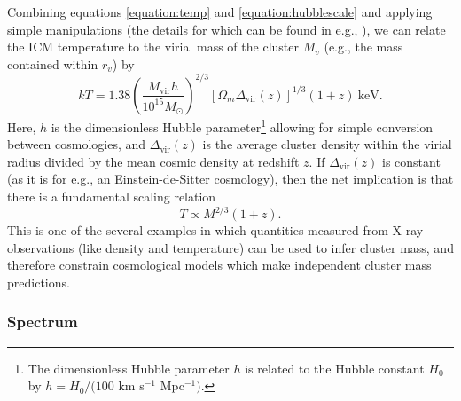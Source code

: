 Combining equations \ref{equation:temp} and \ref{equation:hubblescale} and applying simple manipulations 
(the details for which can be found in e.g., \citealt{rosati02}), we can relate the ICM temperature 
to the virial mass of the cluster $M_v$
(e.g., the mass contained within $r_v$) by 
\begin{equation}
kT = 1.38 \left( \frac{M_\mathrm{vir} h}{10^{15} M_\odot}    \right)^{2/3} \left[\Omega_m \Delta_\mathrm{vir}\left(z\right)\right]^{1/3}  \left( 1 + z \right) ~ \mathrm{keV}. 
\label{equation:tvir}
\end{equation}
Here, $ h$ is the dimensionless Hubble parameter\footnote{The dimensionless Hubble parameter $h$ is related to the Hubble constant $H_0$ by $ h = H_0 / ( 100 $ km s$^{-1}$ Mpc$^{-1})$.} allowing for simple conversion between cosmologies, 
and $\Delta_\mathrm{vir} \left(z\right)$ is the average cluster density within the virial radius divided by the mean cosmic density 
at redshift $z$. 
If $\Delta_\mathrm{vir} \left(z\right)$ is constant (as it is for e.g., an Einstein-de-Sitter cosmology), then the 
net implication is that there is a fundamental scaling relation 
\begin{equation}
T \propto M^{2/3} \left( 1 + z \right).
\label{equation:tmass}
\end{equation}
This is one of the several examples in which quantities measured from X-ray observations (like density and temperature)
can be used to infer cluster mass, and therefore constrain cosmological models which make independent cluster 
mass predictions. 


\subsubsection{{\bf Spectrum}}


